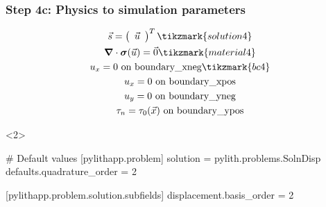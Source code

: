 \documentclass[aspectratio=169]{beamer}
\begin{document}
\begin{frame}[t,fragile]
  \frametitle{Step 4c: Physics to simulation parameters}
  \summary{}

  \begin{minipage}[t]{0.3\textwidth}
    {\scriptsize
    \begin{gather*}
        \vec{s} = \left(\begin{array}{c} \vec{u} \end{array}\right)^T \tikzmark{solution4}\\
        \tensor{\nabla} \cdot \tensor{\sigma}(\vec{u}) = \vec{0} \tikzmark{material4}\\
        u_x = 0 \text{ on boundary\_xneg} \tikzmark{bc4}\\
        u_x = 0 \text{ on boundary\_xpos} \\
        u_y = 0 \text{ on boundary\_yneg} \\
        \tau_n = \tau_0(\vec{x}) \text{ on boundary\_ypos}
    \end{gather*}}
  \end{minipage}
  \hfill
  \begin{minipage}[t]{0.67\textwidth}
    \begin{onlyenv}<2>
      \begin{cfgcode}
        # Default values
        [pylithapp.problem]
        solution = pylith.problems.SolnDisp
        defaults.quadrature_order = 2
        
        [pylithapp.problem.solution.subfields]
        displacement.basis_order = 2
      \end{cfgcode}
    \end{onlyenv}
  \end{minipage}

  
\end{frame}
\end{document}
